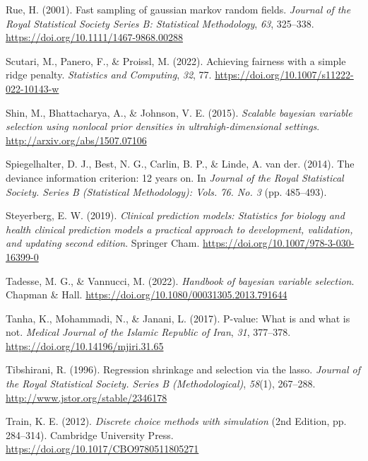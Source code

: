 \documentclass[
  11pt,
]{article}
\newlength{\cslhangindent}
\newlength{\cslentryspacingunit} %
\newenvironment{CSLReferences}[2] %
 {%
  \setlength{\parindent}{0pt}
  \ifodd #1
  \let\oldpar\par
  \def\par{\hangindent=\cslhangindent\oldpar}
  \fi
  \setlength{\parskip}{#2\cslentryspacingunit}
 }%
 {}
\begin{document}
\begin{CSLReferences}{1}{0}
\leavevmode{}%
Rue, H. (2001). Fast sampling of gaussian markov random fields.
\emph{Journal of the Royal Statistical Society Series B: Statistical
Methodology}, \emph{63}, 325--338.
\url{https://doi.org/10.1111/1467-9868.00288}

\leavevmode{}%
Scutari, M., Panero, F., \& Proissl, M. (2022). Achieving fairness with
a simple ridge penalty. \emph{Statistics and Computing}, \emph{32}, 77.
\url{https://doi.org/10.1007/s11222-022-10143-w}

\leavevmode{}%
Shin, M., Bhattacharya, A., \& Johnson, V. E. (2015). \emph{Scalable
bayesian variable selection using nonlocal prior densities in
ultrahigh-dimensional settings}. \url{http://arxiv.org/abs/1507.07106}

\leavevmode{}%
Spiegelhalter, D. J., Best, N. G., Carlin, B. P., \& Linde, A. van der.
(2014). The deviance information criterion: 12 years on. In
\emph{Journal of the Royal Statistical Society. Series B (Statistical
Methodology): Vols. 76. No. 3} (pp. 485--493).

\leavevmode{}%
Steyerberg, E. W. (2019). \emph{Clinical prediction models: Statistics
for biology and health clinical prediction models a practical approach
to development, validation, and updating second edition}. Springer Cham.
\url{https://doi.org/10.1007/978-3-030-16399-0}

\leavevmode{}%
Tadesse, M. G., \& Vannucci, M. (2022). \emph{Handbook of bayesian
variable selection}. Chapman \& Hall.
\url{https://doi.org/10.1080/00031305.2013.791644}

\leavevmode{}%
Tanha, K., Mohammadi, N., \& Janani, L. (2017). P-value: What is and
what is not. \emph{Medical Journal of the Islamic Republic of Iran},
\emph{31}, 377--378. \url{https://doi.org/10.14196/mjiri.31.65}

\leavevmode{}%
Tibshirani, R. (1996). Regression shrinkage and selection via the lasso.
\emph{Journal of the Royal Statistical Society. Series B
(Methodological)}, \emph{58}(1), 267--288.
\url{http://www.jstor.org/stable/2346178}

\leavevmode{}%
Train, K. E. (2012). \emph{Discrete choice methods with simulation} (2nd
Edition, pp. 284--314). Cambridge University Press.
\url{https://doi.org/10.1017/CBO9780511805271}


\end{CSLReferences}
\end{document}
